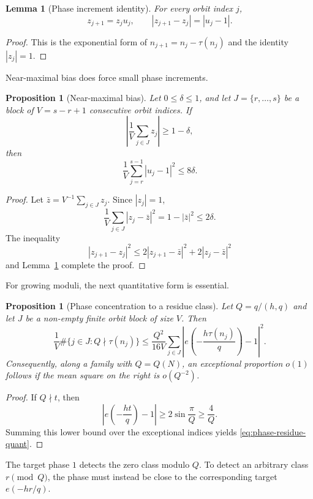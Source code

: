 \documentclass[11pt]{article}
\newtheorem{lemma}[theorem]{Lemma}
\newtheorem{proposition}[theorem]{Proposition}
\theoremstyle{definition}
\theoremstyle{remark}
\begin{document}
\begin{lemma}[Phase increment identity]\label{lem:phase-identity}
For every orbit index $j$,
\[
 z_{j+1}=z_ju_j,
 \qquad
 |z_{j+1}-z_j|=|u_j-1|.
\]
\end{lemma}

\begin{proof}
This is the exponential form of
$n_{j+1}=n_j-\tau(n_j)$ and the identity $|z_j|=1$.
\end{proof}

Near-maximal bias does force small phase increments.

\begin{proposition}[Near-maximal bias]\label{prop:max-bias}
Let $0\leq\delta\leq1$, and let $J=\{r,\ldots,s\}$ be a block of
$V=s-r+1$ consecutive orbit indices.  If
\[
 \left|\frac1V\sum_{j\in J}z_j\right|\geq1-\delta,
\]
then
\[
 \frac1V\sum_{j=r}^{s-1}|u_j-1|^2\leq8\delta.
\]
\end{proposition}

\begin{proof}
Let $\bar z=V^{-1}\sum_{j\in J}z_j$.  Since $|z_j|=1$,
\[
 \frac1V\sum_{j\in J}|z_j-\bar z|^2
 =1-|\bar z|^2\leq2\delta.
\]
The inequality
\[
 |z_{j+1}-z_j|^2
 \leq2|z_{j+1}-\bar z|^2+2|z_j-\bar z|^2
\]
and Lemma~\ref{lem:phase-identity} complete the proof.
\end{proof}

For growing moduli, the next quantitative form is essential.

\begin{proposition}[Phase concentration to a residue class]
\label{prop:phase-residue}
Let $Q=q/(h,q)$ and let $J$ be a non-empty finite orbit block of size
$V$.  Then
\begin{equation}\label{eq:phase-residue-quant}
 \frac1V\#\{j\in J:Q\nmid\tau(n_j)\}
 \leq\frac{Q^2}{16V}
 \sum_{j\in J}
 \left|e\!\left(-\frac{h\tau(n_j)}q\right)-1\right|^2.
\end{equation}
Consequently, along a family with $Q=Q(N)$, an exceptional proportion
$o(1)$ follows if the mean square on the right is $o(Q^{-2})$.
\end{proposition}

\begin{proof}
If $Q\nmid t$, then
\[
 \left|e\!\left(-\frac{ht}q\right)-1\right|
 \geq2\sin\frac\pi Q\geq\frac4Q.
\]
Summing this lower bound over the exceptional indices yields
\eqref{eq:phase-residue-quant}.
\end{proof}

The target phase $1$ detects the zero class modulo $Q$.  To detect an
arbitrary class $r\pmod Q$, the phase must instead be close to the
corresponding target $e(-hr/q)$.
\end{document}
